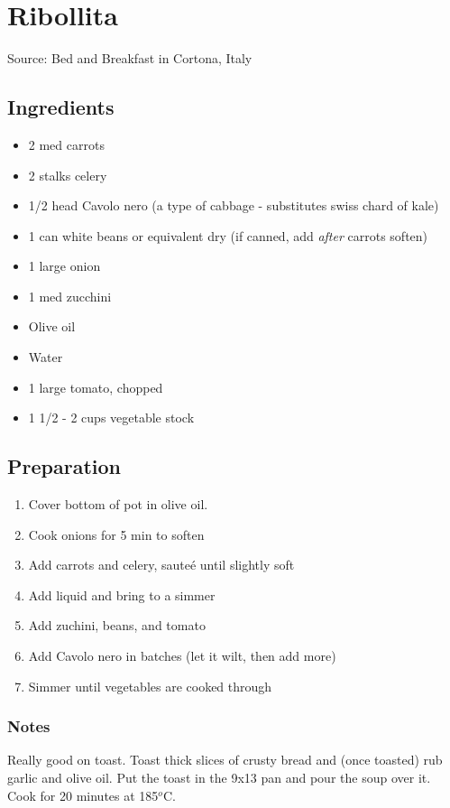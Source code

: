 \section{Ribollita}

\begin{center}
Source: Bed and Breakfast in Cortona, Italy
\end{center}

\subsection{Ingredients}
\begin{multicols}{2}
\begin{itemize}
    \item 2 med carrots
    \item 2 stalks celery
    \item 1/2 head Cavolo nero (a type of cabbage - substitutes swiss chard of kale)
    \item 1 can white beans or equivalent dry (if canned, add \emph{after} carrots soften)
    \item 1 large onion
    \item 1 med zucchini
    \item Olive oil
    \item Water
    \item 1 large tomato, chopped
    \item 1 1/2 - 2 cups vegetable stock
\end{itemize}
\end{multicols}

\subsection{Preparation}
\begin{enumerate}
    \item Cover bottom of pot in olive oil.
    \item Cook onions for 5 min to soften
    \item Add carrots and celery, saute\'{e} until slightly soft
    \item Add liquid and bring to a simmer
    \item Add zuchini, beans, and tomato
    \item Add Cavolo nero in batches (let it wilt, then add more)
    \item Simmer until vegetables are cooked through
\end{enumerate}

\subsubsection{Notes}
Really good on toast.
Toast thick slices of crusty bread and (once toasted) rub garlic and olive oil.
Put the toast in the 9x13 pan and pour the soup over it.
Cook for 20 minutes at 185$^o$C.
